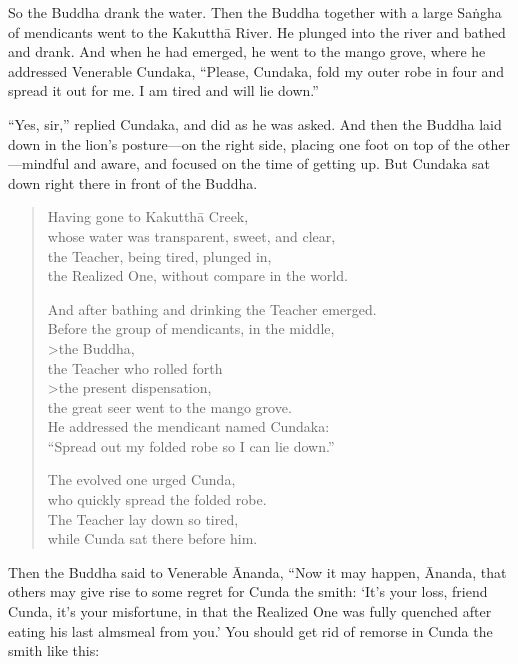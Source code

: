 \documentclass[12pt,openany]{book}%
\begin{document}
So the Buddha drank the water. Then the Buddha together with a large \textsanskrit{Saṅgha} of mendicants went to the \textsanskrit{Kakutthā} River. He plunged into the river and bathed and drank. And when he had emerged, he went to the mango grove, where he addressed Venerable Cundaka, “Please, Cundaka, fold my outer robe in four and spread it out for me. I am tired and will lie down.” 

“Yes, sir,” replied Cundaka, and did as he was asked. And then the Buddha laid down in the lion’s posture—on the right side, placing one foot on top of the other—mindful and aware, and focused on the time of getting up. But Cundaka sat down right there in front of the Buddha. 

\begin{verse}%
Having gone to \textsanskrit{Kakutthā} Creek, \\
whose water was transparent, sweet, and clear, \\
the Teacher, being tired, plunged in, \\
the Realized One, without compare in the world. 

And after bathing and drinking the Teacher emerged. \\
Before the group of mendicants, in the middle, \\>the Buddha, \\
the Teacher who rolled forth \\>the present dispensation, \\
the great seer went to the mango grove. \\
He addressed the mendicant named Cundaka: \\
“Spread out my folded robe so I can lie down.” 

The evolved one urged Cunda, \\
who quickly spread the folded robe. \\
The Teacher lay down so tired, \\
while Cunda sat there before him. 

%
\end{verse}

Then the Buddha said to Venerable Ānanda, “Now it may happen, Ānanda, that others may give rise to some regret for Cunda the smith: ‘It’s your loss, friend Cunda, it’s your misfortune, in that the Realized One was fully quenched after eating his last almsmeal from you.’ You should get rid of remorse in Cunda the smith like this: 
\end{document}
